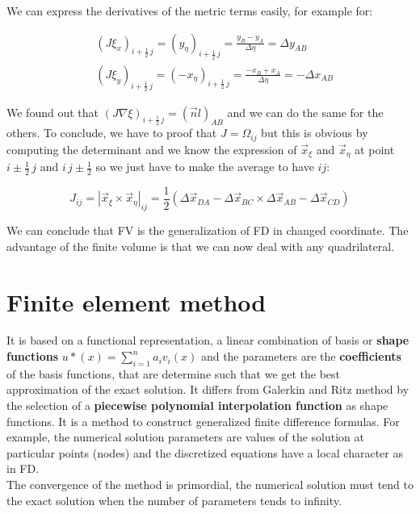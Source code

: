 We can express the derivatives of the metric terms easily, for example for: 

\begin{equation}
\begin{aligned}
&(J\xi _x)_{i+\frac{1}{2}\, j} = (y_\eta) _{i+\frac{1}{2}\, j} = \frac{y_B - y_A}{\Delta \eta} = \Delta y_{AB}\\
&(J\xi _y)_{i+\frac{1}{2}\, j} = (-x_\eta) _{i+\frac{1}{2}\, j} = \frac{-x_B + x_A}{\Delta \eta} = -\Delta x_{AB}
\end{aligned}
\end{equation}

We found out that $(J\nabla \xi)_{i+\frac{1}{2}\, j} = (\vec{n} l)_{AB}$ and we can do the same for the others. To conclude, we have to proof that $J = \Omega _{ij}$ but this is obvious by computing the determinant and we know the expression of $\vec{x}_\xi$ and $\vec{x}_\eta$ at point $i\pm \frac{1}{2} \, j$ and $i\, j \pm\frac{1}{2}$ so we just have to make the average to have $ij$: 

\begin{equation}
J_{ij} = |\vec{x}_\xi \times \vec{x}_\eta |_{ij} = \frac{1}{2}(\Delta \vec{x}_{DA}-\Delta \vec{x}_{BC}\times \Delta \vec{x}_{AB}- \Delta \vec{x}_{CD})
\end{equation}

We can conclude that FV is the generalization of FD in changed coordinate. The advantage of the finite volume is that we can now deal with any quadrilateral. 

\section{Finite element method}
It is based on a functional representation, a linear combination of basis or \textbf{shape functions} $u*(x) = \sum _{i=1}^n a_iv_i(x)$ and the parameters are the \textbf{coefficients} of the basis functions, that are determine such that we get the best approximation of the exact solution. It differs from Galerkin and Ritz method by the selection of a \textbf{piecewise polynomial interpolation function} as shape functions. It is a method to construct generalized finite difference formulas. For example, the numerical solution parameters are values of the solution at particular points (nodes) and the discretized equations have a local character as in FD. \\

The convergence of the method is primordial, the numerical solution must tend to the exact solution when the number of parameters tends to infinity.

